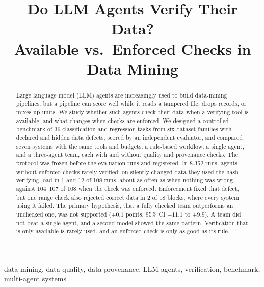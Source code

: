 \documentclass[conference]{IEEEtran}
\begin{document}
\title{Do LLM Agents Verify Their Data?\\ Available vs.\ Enforced Checks in Data Mining}

\author{
}

\maketitle

\begin{abstract}
Large language model (LLM) agents are increasingly used to build data-mining pipelines, but a pipeline can score well
while it reads a tampered file, drops records, or mixes up units. We study whether such agents check their data when
a verifying tool is available, and what changes when checks are enforced. We designed a controlled benchmark of 36
classification and regression tasks from six dataset families with declared and hidden data defects, scored by an
independent evaluator, and compared seven systems with the same tools and budgets: a rule-based workflow, a single
agent, and a three-agent team, each with and without quality and provenance checks. The protocol was frozen before
the evaluation runs and registered. In 8,352 runs, agents without enforced checks rarely verified: on silently changed
data they used the hash-verifying load in 1 and 12 of 108 runs, about as often as when nothing was wrong, against
104--107 of 108 when the check was enforced. Enforcement fixed that defect, but one range check also rejected correct
data in 2 of 18 blocks, where every system using it failed. The primary hypothesis, that a fully checked team
outperforms an unchecked one, was not supported ($+0.1$ points, 95\% CI $-11.1$ to $+9.9$). A team did not beat a
single agent, and a second model showed the same pattern. Verification that is only available is rarely used, and an
enforced check is only as good as its rule.
\end{abstract}

\begin{IEEEkeywords}
data mining, data quality, data provenance, LLM agents, verification, benchmark, multi-agent systems
\end{IEEEkeywords}
\end{document}
